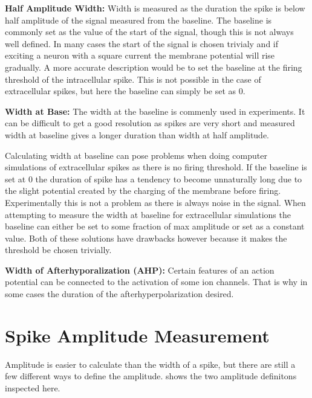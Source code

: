 \documentclass[altfont, fleqn]{uiophd}
\renewcommand{\Cref}[1]{{\color{viridis_03}\myCref{#1}}}
\begin{document}
\noindent 
{\bf Half Amplitude Width:} 
Width is measured as the duration the spike is below half amplitude of the 
signal measured from the baseline.
The baseline is commonly set as the value of the start of the signal, 
though this is not always well defined. 
In many cases the start of the signal is chosen trivialy
and if exciting a neuron with a square current the membrane potential will 
rise gradually. 
A more accurate description would be to set the baseline at the firing 
threshold of 
the intracellular spike. 
This is not possible in the case of extracellular spikes,
but here the baseline can simply be set as 0. 
\newline

\noindent 
{\bf Width at Base:} 
The width at the baseline is commenly used in experiments.
It can be difficult to get a good resolution as spikes are very short
and measured width at baseline gives a longer duration than width at half 
amplitude. 

Calculating width at baseline can pose problems when doing computer simulations
of extracellular spikes as there is no firing threshold. 
If the baseline is set at 0 the duration of spike has a tendency to become 
unnaturally long due to the slight potential created by the charging
of the membrane before firing. 
Experimentally this is not a problem as there is always noise
in the signal. 
When attempting to measure 
the width at baseline for extracellular simulations
the baseline can either be set to some fraction of max amplitude
or set as a constant value. 
Both of these solutions have drawbacks however because 
it makes the threshold be chosen trivially. 
\newline

\noindent 
{\bf Width of Afterhyporalization (AHP):} 
Certain features of an action potential can be connected
to the 
activation of some ion channels. 
That is why in some cases the duration of the afterhyperpolarization 
desired. 
\newline

\section{Spike Amplitude Measurement}
Amplitude is easier to calculate than the width of a spike, 
but there are still a few different ways to define the amplitude. 
\Cref{fig:3_ap_eap} shows the two amplitude definitons inspected here. 
\newline
\end{document}

